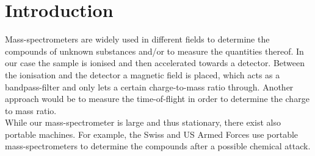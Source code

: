 \section{Introduction} \label{sec:introduction}
Mass-spectrometers are widely used in different fields to determine the compounds of unknown substances and/or to measure the quantities thereof. 
In our case the sample is ionised and then accelerated towards a detector. Between the ionisation and the detector a magnetic field is placed, which acts as a bandpass-filter and only lets a certain charge-to-mass ratio through. 
Another approach would be to measure the time-of-flight in order to determine the charge to mass ratio.\\
While our mass-spectrometer is large and thus stationary, there exist also portable machines. For example, the Swiss and US Armed Forces use portable mass-spectrometers to determine the compounds after a possible chemical attack. \cite{army}